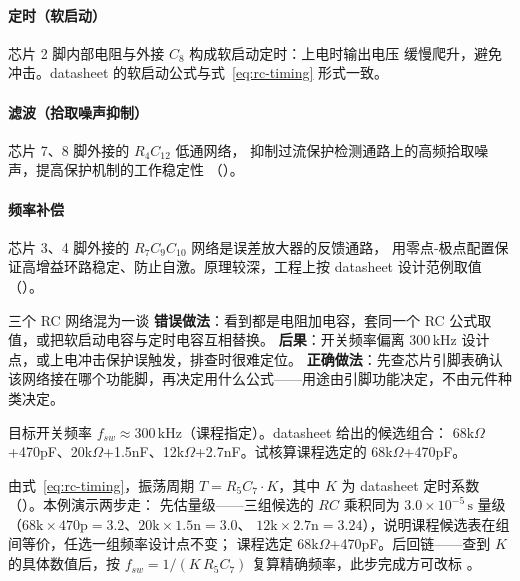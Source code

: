 \paragraph{定时（软启动）} 芯片 2 脚内部电阻与外接 $C_8$ 构成软启动定时：上电时输出电压
缓慢爬升，避免冲击。datasheet 的软启动公式与式~\eqref{eq:rc-timing} 形式一致。

\paragraph{滤波（拾取噪声抑制）} 芯片 7、8 脚外接的 $R_4 C_{12}$ 低通网络，
抑制过流保护检测通路上的高频拾取噪声，提高保护机制的工作稳定性
（）。

\paragraph{频率补偿} 芯片 3、4 脚外接的 $R_7 C_9 C_{10}$ 网络是误差放大器的反馈通路，
用零点-极点配置保证高增益环路稳定、防止自激。原理较深，工程上按 datasheet 设计范例取值
（）。

\begin{misconception}{三个 RC 网络混为一谈}
\textbf{错误做法}：看到都是电阻加电容，套同一个 RC 公式取值，或把软启动电容与定时电容互相替换。
\textbf{后果}：开关频率偏离 300\,kHz 设计点，或上电冲击保护误触发，排查时很难定位。
\textbf{正确做法}：先查芯片引脚表确认该网络接在哪个功能脚，再决定用什么公式——用途由引脚功能决定，不由元件种类决定。
\end{misconception}

\begin{example}[振荡频率 RC 选型]
目标开关频率 $f_{sw} \approx 300\,\mathrm{kHz}$（课程指定）。datasheet 给出的候选组合：
68k$\Omega$+470pF、20k$\Omega$+1.5nF、12k$\Omega$+2.7nF。试核算课程选定的 68k$\Omega$+470pF。

\begin{solution}
由式~\eqref{eq:rc-timing}，振荡周期 $T = R_5 C_7 \cdot K$，其中 $K$ 为 datasheet
定时系数（）。本例演示两步走：
先估量级——三组候选的 $RC$ 乘积同为 $3.0\times10^{-5}\,\mathrm{s}$ 量级
（$68\mathrm{k}\times470\mathrm{p}=3.2$、$20\mathrm{k}\times1.5\mathrm{n}=3.0$、
$12\mathrm{k}\times2.7\mathrm{n}=3.24$），说明课程候选表在组间等价，任选一组频率设计点不变；
课程选定 68k$\Omega$+470pF。后回链——查到 $K$ 的具体数值后，按
$f_{sw}=1/(K\,R_5 C_7)$ 复算精确频率，此步完成方可改标 。
\end{solution}
\end{example}

